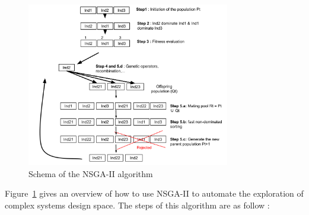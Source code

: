 \documentclass[conference]{IEEEtran}
\begin{document}
\begin{figure}[!t]
\centering
\includegraphics[width=3.49in]{NSGAII.pdf}
\caption{Schema of the NSGA-II algorithm}
\label{nsgaii}
\end{figure}

Figure~\ref{nsgaii} gives an overview of how to use NSGA-II to automate the exploration of complex systems design space. The steps of this algorithm are as follow :
\end{document}
